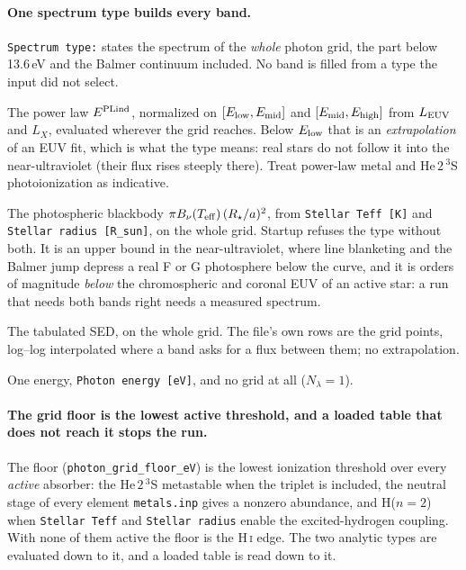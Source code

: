 \documentclass[english,a4paper]{my_memo}
\begin{document}
\paragraph{One spectrum type builds every band.} \texttt{Spectrum type:}
states the spectrum of the \emph{whole} photon grid, the part below 13.6\,eV
and the Balmer continuum included. No band is filled from a type the input did
not select.
\begin{description}\itemsep3pt
\item[\textmd{\texttt{Power-law}.}] The power law $E^{\rm PLind}$, normalized
  on $[E_{\rm low},E_{\rm mid}]$ and $[E_{\rm mid},E_{\rm high}]$ from
  $L_{\rm EUV}$ and $L_X$, evaluated wherever the grid reaches. Below
  $E_{\rm low}$ that is an \emph{extrapolation} of an EUV fit, which is what
  the type means: real stars do not follow it into the near-ultraviolet
  (their flux rises steeply there). Treat power-law metal and He\,$2\,^3$S
  photoionization as indicative.
\item[\textmd{\texttt{Planck}.}] The photospheric blackbody
  $\pi B_\nu(T_{\rm eff})\,(R_\star/a)^2$, from \texttt{Stellar Teff [K]} and
  \texttt{Stellar radius [R\_sun]}, on the whole grid. Startup refuses the
  type without both. It is an upper bound in the near-ultraviolet, where line
  blanketing and the Balmer jump depress a real F or G photosphere below the
  curve, and it is orders of magnitude \emph{below} the chromospheric and
  coronal EUV of an active star: a run that needs both bands right needs a
  measured spectrum.
\item[\textmd{\texttt{Load} (\texttt{Spectrum file:}).}] The tabulated SED, on
  the whole grid. The file's own rows are the grid points, log--log
  interpolated where a band asks for a flux between them; no extrapolation.
\item[\textmd{\texttt{Monochromatic}.}] One energy, \texttt{Photon energy
  [eV]}, and no grid at all ($N_\lambda=1$).
\end{description}

\paragraph{The grid floor is the lowest active threshold, and a loaded table
that does not reach it stops the run.} The floor
(\texttt{photon\_grid\_floor\_eV}) is the lowest ionization threshold over
every \emph{active} absorber: the He\,$2\,^3$S metastable when the triplet is
included, the neutral stage of every element \texttt{metals.inp} gives a
nonzero abundance, and H($n{=}2$) when \texttt{Stellar Teff} and
\texttt{Stellar radius} enable the excited-hydrogen coupling. With none of them
active the floor is the H\,\textsc{i} edge. The two analytic types are
evaluated down to it, and a loaded table is read down to it.
\end{document}
